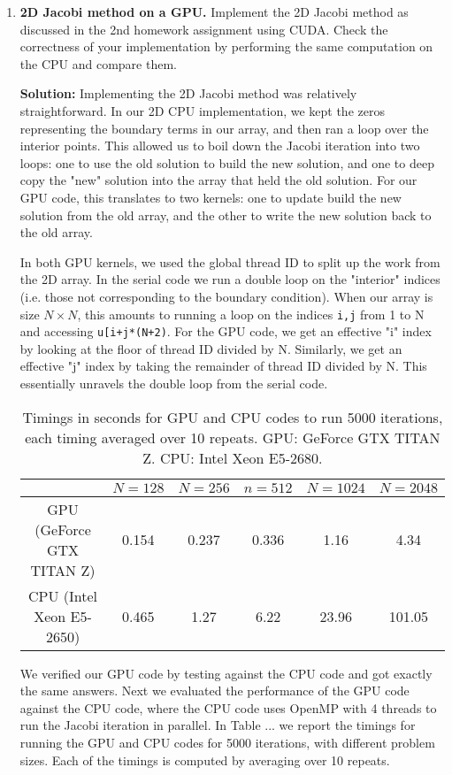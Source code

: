 \documentclass[10pt]{article}
\begin{document}
\begin{enumerate}
\item \textbf{2D Jacobi method on a GPU.} Implement the 2D Jacobi method as discussed in the 2nd homework assignment using CUDA. Check the correctness of your implementation by performing the same computation on the CPU and compare them.


\textbf{Solution:} Implementing the 2D Jacobi method was relatively straightforward. In our 2D CPU implementation, we kept the zeros representing the boundary terms in our array, and then ran a loop over the interior points. This allowed us to boil down the Jacobi iteration into two loops: one to use the old solution to build the new solution, and one to deep copy the "new" solution into the array that held the old solution. For our GPU code, this translates to two kernels: one to update build the new solution from the old array, and the other to write the new solution back to the old array.

In both GPU kernels, we used the global thread ID to split up the work from the 2D array. In the serial code we run a double loop on the "interior" indices (i.e. those not corresponding to the boundary condition). When our array is size $N \times N$, this amounts to running a loop on the indices \texttt{i,j} from 1 to N and accessing \texttt{u[i+j*(N+2)}. For the GPU code, we get an effective "i" index by looking at the floor of thread ID divided by N. Similarly, we get an effective "j" index by taking the remainder of thread ID divided by N. This essentially unravels the double loop from the serial code.

\begin{table}[!ht]
\centering
\caption{Timings in seconds for GPU and CPU codes to run 5000 iterations, each timing averaged over 10 repeats. GPU: GeForce GTX TITAN Z. CPU: Intel Xeon E5-2680.}
\begin{tabular}{| c | c | c | c | c | c | }
\hline
 & $N=128$ & $N=256$ & $n=512$ & $N=1024$ & $N=2048$\\
\hline
GPU (GeForce GTX TITAN Z)   & 0.154 & 0.237 & 0.336 & 1.16 & 4.34  \\
CPU (Intel Xeon E5-2650)  & 0.465  & 1.27 & 6.22  & 23.96 & 101.05\\
\hline
\end{tabular}
\label{jacobi}
\end{table}

We verified our GPU code by testing against the CPU code and got exactly the same answers. Next we evaluated the performance of the GPU code against the CPU code, where the CPU code uses OpenMP with 4 threads to run the Jacobi iteration in parallel. In Table ... we report the timings for running the  GPU and CPU codes for 5000 iterations, with different problem sizes. Each of the timings is computed by averaging over 10 repeats.



\end{enumerate}
\end{document}
